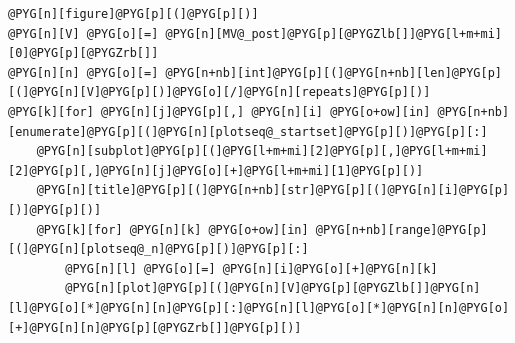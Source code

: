 \documentclass[letterpaper,10pt,english]{manual}
\begin{document}
\begin{Verbatim}[commandchars=@\[\]]
@PYG[n][figure]@PYG[p][(]@PYG[p][)]
@PYG[n][V] @PYG[o][=] @PYG[n][MV@_post]@PYG[p][@PYGZlb[]]@PYG[l+m+mi][0]@PYG[p][@PYGZrb[]]
@PYG[n][n] @PYG[o][=] @PYG[n+nb][int]@PYG[p][(]@PYG[n+nb][len]@PYG[p][(]@PYG[n][V]@PYG[p][)]@PYG[o][/]@PYG[n][repeats]@PYG[p][)]
@PYG[k][for] @PYG[n][j]@PYG[p][,] @PYG[n][i] @PYG[o+ow][in] @PYG[n+nb][enumerate]@PYG[p][(]@PYG[n][plotseq@_startset]@PYG[p][)]@PYG[p][:]
    @PYG[n][subplot]@PYG[p][(]@PYG[l+m+mi][2]@PYG[p][,]@PYG[l+m+mi][2]@PYG[p][,]@PYG[n][j]@PYG[o][+]@PYG[l+m+mi][1]@PYG[p][)]
    @PYG[n][title]@PYG[p][(]@PYG[n+nb][str]@PYG[p][(]@PYG[n][i]@PYG[p][)]@PYG[p][)]
    @PYG[k][for] @PYG[n][k] @PYG[o+ow][in] @PYG[n+nb][range]@PYG[p][(]@PYG[n][plotseq@_n]@PYG[p][)]@PYG[p][:]
        @PYG[n][l] @PYG[o][=] @PYG[n][i]@PYG[o][+]@PYG[n][k]
        @PYG[n][plot]@PYG[p][(]@PYG[n][V]@PYG[p][@PYGZlb[]]@PYG[n][l]@PYG[o][*]@PYG[n][n]@PYG[p][:]@PYG[n][l]@PYG[o][*]@PYG[n][n]@PYG[o][+]@PYG[n][n]@PYG[p][@PYGZrb[]]@PYG[p][)]


\end{Verbatim}
\end{document}
